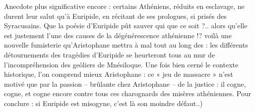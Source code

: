 {{Anecdote plus significative encore : certains Athéniens, réduits en esclavage, ne durent leur salut qu'à Euripide, en récitant de ses prologues, si prisés des Syracusains. Que la poésie d'Euripide pût sauver qui que ce soit ?.. alors qu'elle est justement l'une des causes de la dégénérescence athénienne !? voilà une nouvelle fumisterie qu'Aristophane mettra à mal tout au long des  : les différents détournements des tragédies d'Euripide se heurteront tous au mur de l'incompréhension des geôliers de Mnésiloque. Une fois bien cerné le contexte historique, l'on comprend mieux Aristophane : ce « jeu de massacre » n'est motivé que par la passion -- brûlante chez Aristophane -- de la justice : il cogne, cogne, et cogne encore contre tous ces charognards des misères athéniennes.  Pour conclure : si Euripide est misogyne, c'est là son moindre défaut.}.)}

